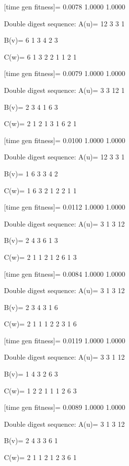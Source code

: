 [time gen fitness]=
    0.0078    1.0000    1.0000

Double digest sequence:
A(u)=
    12     3     3     1

B(v)=
     6     1     3     4     2     3

C(w)=
     6     1     3     2     2     1     1     2     1

[time gen fitness]=
    0.0079    1.0000    1.0000

Double digest sequence:
A(u)=
     3     3    12     1

B(v)=
     2     3     4     1     6     3

C(w)=
     2     1     2     1     3     1     6     2     1

[time gen fitness]=
    0.0100    1.0000    1.0000

Double digest sequence:
A(u)=
    12     3     3     1

B(v)=
     1     6     3     3     4     2

C(w)=
     1     6     3     2     1     2     2     1     1

[time gen fitness]=
    0.0112    1.0000    1.0000

Double digest sequence:
A(u)=
     3     1     3    12

B(v)=
     2     4     3     6     1     3

C(w)=
     2     1     1     2     1     2     6     1     3

[time gen fitness]=
    0.0084    1.0000    1.0000

Double digest sequence:
A(u)=
     3     1     3    12

B(v)=
     2     3     4     3     1     6

C(w)=
     2     1     1     1     2     2     3     1     6

[time gen fitness]=
    0.0119    1.0000    1.0000

Double digest sequence:
A(u)=
     3     3     1    12

B(v)=
     1     4     3     2     6     3

C(w)=
     1     2     2     1     1     1     2     6     3

[time gen fitness]=
    0.0089    1.0000    1.0000

Double digest sequence:
A(u)=
     3     1     3    12

B(v)=
     2     4     3     3     6     1

C(w)=
     2     1     1     2     1     2     3     6     1


